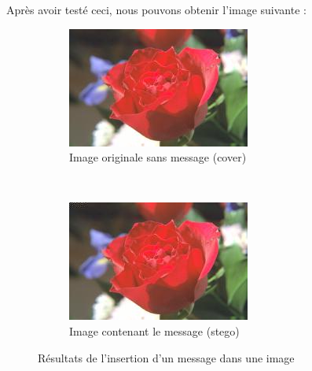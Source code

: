 Après avoir testé ceci, nous pouvons obtenir l'image suivante :
\begin{figure}[H]
    \centering
    \begin{subfigure}[b]{0.45\textwidth}
        \includegraphics[width=\textwidth]{../SRC/testorig.jpg}
        \caption{Image originale sans message (cover)}
        \label{img:8}
    \end{subfigure}
    ~ %
    \begin{subfigure}[b]{0.45\textwidth}
        \includegraphics[width=\textwidth]{../SRC/toto.jpg}
        \caption{Image contenant le message (stego)}
        \label{img:9}
    \end{subfigure}
    \caption{Résultats de l'insertion d'un message dans une image}\label{fig:insert}
\end{figure}
